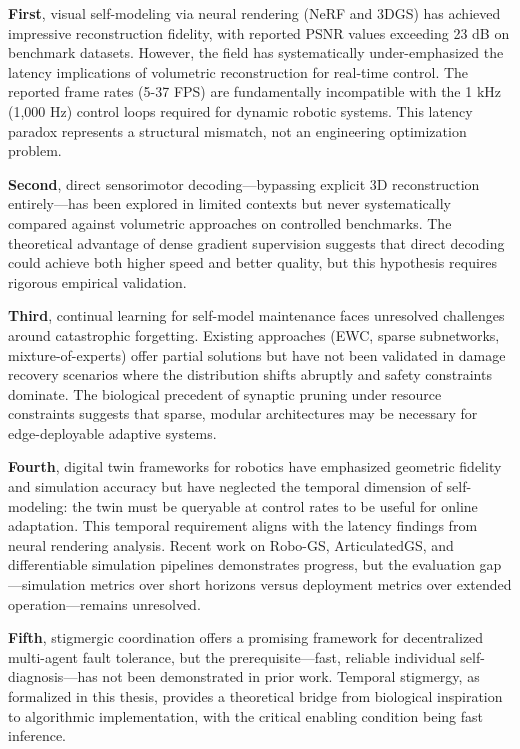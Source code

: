 \documentclass[12pt,a4paper,oneside]{report}
\begin{document}
\textbf{First}, visual self-modeling via neural rendering (NeRF and 3DGS) has achieved impressive reconstruction fidelity, with reported PSNR values exceeding 23 dB on benchmark datasets. However, the field has systematically under-emphasized the latency implications of volumetric reconstruction for real-time control. The reported frame rates (5-37 FPS) are fundamentally incompatible with the 1 kHz (1,000 Hz) control loops required for dynamic robotic systems. This latency paradox represents a structural mismatch, not an engineering optimization problem.

\textbf{Second}, direct sensorimotor decoding—bypassing explicit 3D reconstruction entirely—has been explored in limited contexts but never systematically compared against volumetric approaches on controlled benchmarks. The theoretical advantage of dense gradient supervision suggests that direct decoding could achieve both higher speed and better quality, but this hypothesis requires rigorous empirical validation.

\textbf{Third}, continual learning for self-model maintenance faces unresolved challenges around catastrophic forgetting. Existing approaches (EWC, sparse subnetworks, mixture-of-experts) offer partial solutions but have not been validated in damage recovery scenarios where the distribution shifts abruptly and safety constraints dominate. The biological precedent of synaptic pruning under resource constraints suggests that sparse, modular architectures may be necessary for edge-deployable adaptive systems.

\textbf{Fourth}, digital twin frameworks for robotics have emphasized geometric fidelity and simulation accuracy but have neglected the temporal dimension of self-modeling: the twin must be queryable at control rates to be useful for online adaptation. This temporal requirement aligns with the latency findings from neural rendering analysis. Recent work on Robo-GS, ArticulatedGS, and differentiable simulation pipelines demonstrates progress, but the evaluation gap—simulation metrics over short horizons versus deployment metrics over extended operation—remains unresolved.

\textbf{Fifth}, stigmergic coordination offers a promising framework for decentralized multi-agent fault tolerance, but the prerequisite—fast, reliable individual self-diagnosis—has not been demonstrated in prior work. Temporal stigmergy, as formalized in this thesis, provides a theoretical bridge from biological inspiration to algorithmic implementation, with the critical enabling condition being fast inference.
\end{document}
